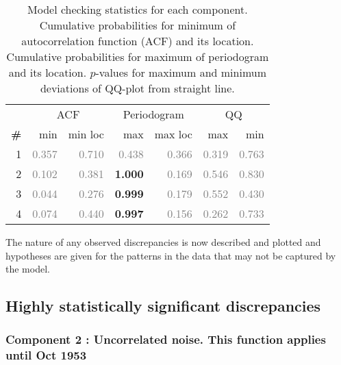 \documentclass{article} %
\begin{document}
\begin{table}[htb]
\begin{center}
{\small
\begin{tabular}{|r|rr|rr|rr|}
\hline
 & \multicolumn{2}{|c|}{ACF} & \multicolumn{2}{|c|}{Periodogram} & \multicolumn{2}{|c|}{QQ} \\
\bf{\#} & {min} & {min loc} & {max} & {max loc} & {max} & {min}\\
\hline

1 & \textcolor{gray}{0.357} & \textcolor{gray}{0.710} & \textcolor{gray}{0.438} & \textcolor{gray}{0.366} & \textcolor{gray}{0.319} & \textcolor{gray}{0.763}\\

2 & \textcolor{gray}{0.102} & \textcolor{gray}{0.381} & \textbf{1.000} & \textcolor{gray}{0.169} & \textcolor{gray}{0.546} & \textcolor{gray}{0.830}\\

3 & \textcolor{gray}{0.044} & \textcolor{gray}{0.276} & \textbf{0.999} & \textcolor{gray}{0.179} & \textcolor{gray}{0.552} & \textcolor{gray}{0.430}\\

4 & \textcolor{gray}{0.074} & \textcolor{gray}{0.440} & \textbf{0.997} & \textcolor{gray}{0.156} & \textcolor{gray}{0.262} & \textcolor{gray}{0.733}\\

\hline
\end{tabular}
\caption{
Model checking statistics for each component.
Cumulative probabilities for minimum of autocorrelation function (ACF) and its location.
Cumulative probabilities for maximum of periodogram and its location.
$p$-values for maximum and minimum deviations of QQ-plot from straight line.
}
\label{table:check}
}
\end{center}
\end{table}

The nature of any observed discrepancies is now described and plotted and hypotheses are given for the patterns in the data that may not be captured by the model.

\subsection{Highly statistically significant discrepancies}

\subsubsection{Component 2 : Uncorrelated noise. This function applies until Oct 1953}
\end{document}
